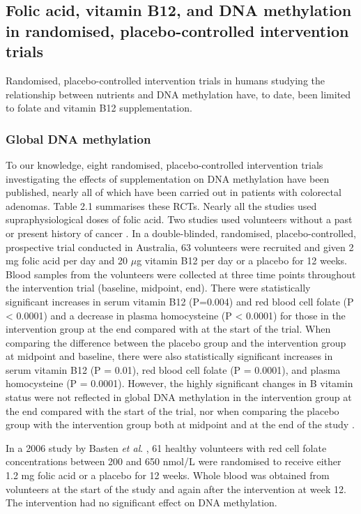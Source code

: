 \subsection{Folic acid, vitamin B12, and DNA methylation in randomised, placebo-controlled intervention trials} %
\noindent Randomised, placebo-controlled intervention trials in humans studying the relationship between nutrients and DNA methylation have, to date, been limited to folate and vitamin B12 supplementation. 
 
\subsubsection{Global DNA methylation} %
\noindent To our knowledge, eight randomised, placebo-controlled intervention trials investigating the effects of supplementation on DNA methylation have been published, nearly all of which have been carried out in patients with colorectal adenomas. Table 2.1 summarises these RCTs. Nearly all the studies used supraphysiological doses of folic acid. Two studies used volunteers without a past or present history of cancer \cite{c251,c252}. In a double-blinded, randomised, placebo-controlled, prospective trial conducted in Australia, 63 volunteers were recruited and given 2 mg folic acid per day and 20 $\mu$g vitamin B12 per day or a placebo for 12 weeks. Blood samples from the volunteers were collected at three time points throughout the intervention trial (baseline, midpoint, end). There were statistically significant increases in serum vitamin B12 (P=0.004) and red blood cell folate (P < 0.0001) and a decrease in plasma homocysteine (P < 0.0001) for those in the intervention group at the end compared with at the start of the trial. When comparing the difference between the placebo group and the intervention group at midpoint and baseline, there were also statistically significant increases in serum vitamin B12 (P = 0.01), red blood cell folate (P = 0.0001), and plasma homocysteine (P = 0.0001). However, the highly significant changes in B vitamin status were not reflected in global DNA methylation in the intervention group at the end compared with the start of the trial, nor when comparing the placebo group with the intervention group both at midpoint and at the end of the study \cite{c252}. 
 
\noindent In a 2006 study by Basten \emph{et al}. \cite{c251}, 61 healthy volunteers with red cell folate concentrations between 200 and 650 nmol/L were randomised to receive either 1.2 mg folic acid or a placebo for 12 weeks. Whole blood was obtained from volunteers at the start of the study and again after the intervention at week 12. The intervention had no significant effect on DNA methylation. 
 
